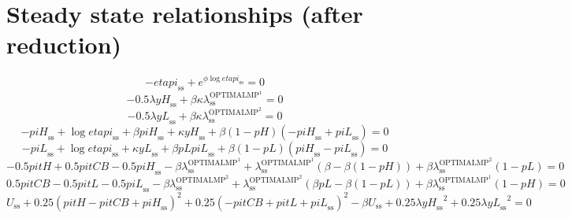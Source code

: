 \section{Steady state relationships (after reduction)}

\begin{equation}
-{e\!t\!a\!p\!i}_\mathrm{ss} + e^{{\phi} {\log{{e\!t\!a\!p\!i}_\mathrm{ss}}}} = 0
\end{equation}
\begin{equation}
-0.5{\lambda} {{y\!H}_\mathrm{ss}} + {\beta} {\kappa} {\lambda^{\mathrm{OPTIMALMP}^{\mathrm{1}}}_\mathrm{ss}} = 0
\end{equation}
\begin{equation}
-0.5{\lambda} {{y\!L}_\mathrm{ss}} + {\beta} {\kappa} {\lambda^{\mathrm{OPTIMALMP}^{\mathrm{2}}}_\mathrm{ss}} = 0
\end{equation}
\begin{equation}
-{p\!i\!H}_\mathrm{ss} + \log{{e\!t\!a\!p\!i}_\mathrm{ss}} + {\beta} {{p\!i\!H}_\mathrm{ss}} + {\kappa} {{y\!H}_\mathrm{ss}} + {\beta} \left(1 - {p\!H}\right) \left(-{p\!i\!H}_\mathrm{ss} + {p\!i\!L}_\mathrm{ss}\right) = 0
\end{equation}
\begin{equation}
-{p\!i\!L}_\mathrm{ss} + \log{{e\!t\!a\!p\!i}_\mathrm{ss}} + {\kappa} {{y\!L}_\mathrm{ss}} + {\beta} {{p\!L}} {{p\!i\!L}_\mathrm{ss}} + {\beta} \left(1 - {p\!L}\right) \left({p\!i\!H}_\mathrm{ss} - {p\!i\!L}_\mathrm{ss}\right) = 0
\end{equation}
\begin{equation}
-0.5{p\!i\!t\!H} + 0.5{p\!i\!t\!C\!B} - 0.5{p\!i\!H}_\mathrm{ss} - {\beta} {\lambda^{\mathrm{OPTIMALMP}^{\mathrm{1}}}_\mathrm{ss}} + {\lambda^{\mathrm{OPTIMALMP}^{\mathrm{1}}}_\mathrm{ss}} \left(\beta - {\beta} \left(1 - {p\!H}\right)\right) + {\beta} {\lambda^{\mathrm{OPTIMALMP}^{\mathrm{2}}}_\mathrm{ss}} \left(1 - {p\!L}\right) = 0
\end{equation}
\begin{equation}
0.5{p\!i\!t\!C\!B} - 0.5{p\!i\!t\!L} - 0.5{p\!i\!L}_\mathrm{ss} - {\beta} {\lambda^{\mathrm{OPTIMALMP}^{\mathrm{2}}}_\mathrm{ss}} + {\lambda^{\mathrm{OPTIMALMP}^{\mathrm{2}}}_\mathrm{ss}} \left({\beta} {{p\!L}} - {\beta} \left(1 - {p\!L}\right)\right) + {\beta} {\lambda^{\mathrm{OPTIMALMP}^{\mathrm{1}}}_\mathrm{ss}} \left(1 - {p\!H}\right) = 0
\end{equation}
\begin{equation}
U_\mathrm{ss} + 0.25\left({p\!i\!t\!H} - {p\!i\!t\!C\!B} + {p\!i\!H}_\mathrm{ss}\right)^{2} + 0.25\left(-{p\!i\!t\!C\!B} + {p\!i\!t\!L} + {p\!i\!L}_\mathrm{ss}\right)^{2} - {\beta} {U_\mathrm{ss}} + 0.25{\lambda} {{y\!H}_\mathrm{ss}}^{2} + 0.25{\lambda} {{y\!L}_\mathrm{ss}}^{2} = 0
\end{equation}






